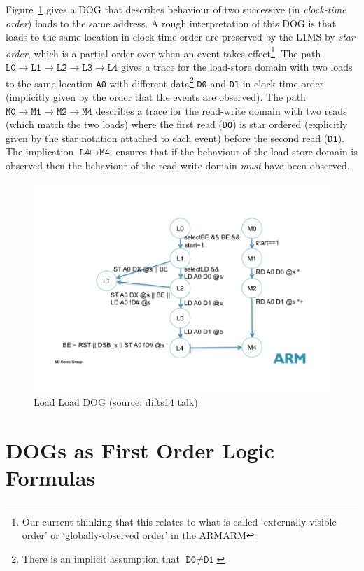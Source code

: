 \documentclass[10pt]{paper}
\newcommand{\state}[1]{\texttt{#1}}
\begin{document}
Figure~\ref{fig:load-load-dog} gives a DOG that describes behaviour of two successive (in \emph{clock-time order}) loads to the same address.
%
A rough interpretation of this DOG is that loads to the same location in clock-time order are preserved by the L1MS by \emph{star order}, which is a partial order over when an event takes effect\footnote{Our current thinking that this relates to what is called `externally-visible order' or `globally-observed order' in the ARMARM}.
%
The path
  $\state{L0} \rightarrow \state{L1}
              \rightarrow \state{L2}
              \rightarrow \state{L3}
              \rightarrow \state{L4}$
gives a trace for the load-store domain with two loads to the same location \texttt{A0} with different data\footnote{There is an implicit assumption that $\texttt{D0} \neq \texttt{D1}$} \texttt{D0} and \texttt{D1} in clock-time order (implicitly given by the order that the events are observed).
%
The path
  $\state{M0} \rightarrow \state{M1}
              \rightarrow \state{M2}
              \rightarrow \state{M4}$
describes a trace for the read-write domain with two reads (which match the two loads) where the first read (\texttt{D0}) is star ordered (explicitly given by the star notation attached to each event) before the second read (\texttt{D1}).
%
The implication $\state{L4} \mapsto \state{M4}$ ensures that if the behaviour of the load-store domain is observed then the behaviour of the read-write domain \emph{must} have been observed.

\begin{figure}[t]
\centering
  \includegraphics[width=.75\textwidth]{figures/loadload.pdf}
\caption{Load Load DOG (source: difts14 talk)}
\label{fig:load-load-dog}
\end{figure}

\section{DOGs as First Order Logic Formulas}
\end{document}
